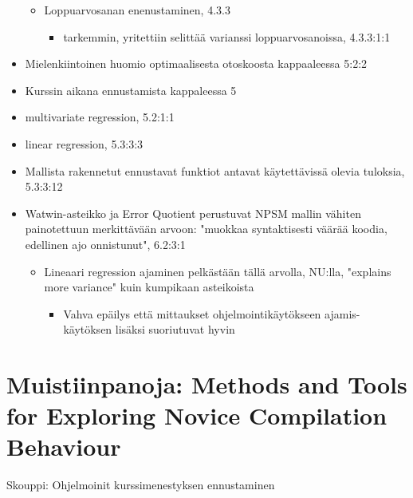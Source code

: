 \begin{itemize}
\begin{itemize}
        \item Loppuarvosanan enenustaminen, 4.3.3
        \begin{itemize}
            \item tarkemmin, yritettiin selittää varianssi loppuarvosanoissa, 4.3.3:1:1
        \end{itemize}
    \end{itemize}
    \item Mielenkiintoinen huomio optimaalisesta otoskoosta kappaaleessa 5:2:2
    \item Kurssin aikana ennustamista kappaleessa 5
    \item multivariate regression, 5.2:1:1
    \item linear regression, 5.3:3:3
    \item Mallista rakennetut ennustavat funktiot antavat käytettävissä olevia tuloksia, 5.3:3:12
    \item Watwin-asteikko ja Error Quotient perustuvat NPSM mallin vähiten painotettuun merkittävään arvoon: "muokkaa syntaktisesti väärää koodia, edellinen ajo onnistunut", 6.2:3:1
    \begin{itemize}
        \item Lineaari regression ajaminen pelkästään tällä arvolla, NU:lla, "explains more variance" kuin kumpikaan asteikoista
        \begin{itemize}
            \item Vahva epäilys että mittaukset ohjelmointikäytökseen ajamis-käytöksen lisäksi suoriutuvat hyvin
        \end{itemize}
    \end{itemize}
\end{itemize}

\section{Muistiinpanoja: Methods and Tools for Exploring Novice Compilation Behaviour\cite{jadud2006methods}}

Skouppi: Ohjelmoinit kurssimenestyksen ennustaminen

